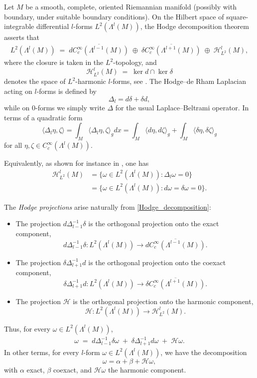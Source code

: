\documentclass[12pt]{amsart}
\begin{document}
Let $M$ be a smooth, complete, oriented Riemannian manifold (possibly with boundary, under suitable boundary conditions).  
On the Hilbert space of square-integrable differential $l$-forms $L^2(\Lambda^l(M))$, the Hodge decomposition theorem asserts that
\begin{align}\label{Hodge_decomposition}
    L^2(\Lambda^l(M)) \;=\; \overline{d C_c^\infty(\Lambda^{l-1}(M))} 
    \;\oplus\; \overline{\delta C_c^\infty(\Lambda^{l+1}(M))} 
    \;\oplus\; \mathcal{H}_{L^2}^l(M),
\end{align}
where the closure is taken in the $L^2$-topology, and 
\[
\mathcal{H}_{L^2}^l(M) \;=\; \ker d \cap \ker \delta
\]
denotes the space of $L^2$-harmonic $l$-forms, see \cite{Carron-noncompact, KK}. The Hodge–de Rham Laplacian acting on $l$-forms is defined by
\[
\Delta_l = d \delta + \delta d,
\]
while on $0$-forms we simply write $\Delta$ for the usual Laplace–Beltrami operator.
In terms of a quadratic form 
\[
\langle \Delta_l \eta , \zeta \rangle = \int_M  \langle \Delta_l \eta,  \zeta \rangle_g dx =\int_M \langle d\eta , d\zeta \rangle_g +
\int_M \langle \delta \eta , \delta \zeta \rangle_g
\]
for all \( \eta, \zeta \in C_c^\infty(\Lambda^{l}(M)) \).

Equivalently, as shown for instance in \cite{Carron-noncompact}, one has
\begin{align*}
    \mathcal{H}_{L^2}^l(M) 
    &= \{ \omega \in L^2(\Lambda^l(M)) : \Delta_l \omega = 0 \} \\
    &= \{ \omega \in L^2(\Lambda^l(M)) : d\omega = \delta \omega = 0 \}.
\end{align*}

The \emph{Hodge projections} arise naturally from \eqref{Hodge_decomposition}: 
\begin{itemize}
    \item The projection $d \Delta_{l-1}^{-1} \delta$ is the orthogonal projection onto the exact component,
    \[
        d \Delta_{l-1}^{-1} \delta: L^2(\Lambda^l(M)) \to \overline{d C_c^\infty(\Lambda^{l-1}(M))}.
    \]
    \item The projection $\delta \Delta_{l+1}^{-1} d$ is the orthogonal projection onto the coexact component,
    \[
        \delta \Delta_{l+1}^{-1} d: L^2(\Lambda^l(M)) \to \overline{\delta C_c^\infty(\Lambda^{l+1}(M))}.
    \]
    \item The projection $\mathcal{H}$ is the orthogonal projection onto the harmonic component,
    \[
        \mathcal{H}: L^2(\Lambda^l(M)) \to \mathcal{H}_{L^2}^l(M).
    \]
\end{itemize}
Thus, for every $\omega \in L^2(\Lambda^l(M))$,
\begin{align*}
    \omega \;=\; d \Delta_{l-1}^{-1} \delta \omega 
    \;+\; \delta \Delta_{l+1}^{-1} d \omega 
    \;+\; \mathcal{H}\omega. 
\end{align*}
In other terms, for every \(l\)-form \(\omega \in L^2(\Lambda^l(M))\), we have the decomposition
\[
\omega = \alpha + \beta + \mathcal{H}\omega,
\]
with \(\alpha\) exact, \(\beta\) coexact, and \(\mathcal{H}\omega\) the harmonic component.
\end{document}
